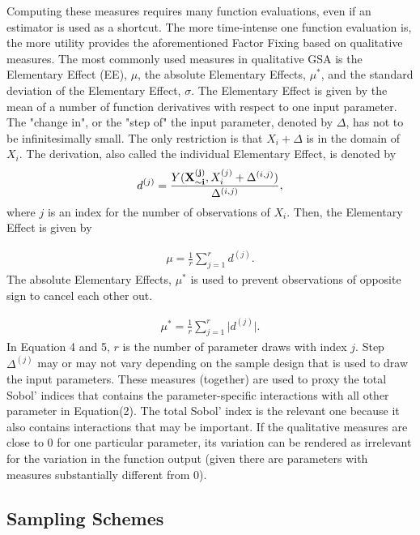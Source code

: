 \documentclass[a4paper,12pt]{article}
\begin{document}
\noindent
Computing these measures requires many function evaluations, even if an estimator is used as a shortcut. The more time-intense one function evaluation is, the more utility provides the aforementioned Factor Fixing based on qualitative measures. The most commonly used measures in qualitative GSA is the Elementary Effect (EE), $\mu$, the absolute Elementary Effects, $\mu^*$, and the standard deviation of the Elementary Effect, $\sigma$. The Elementary Effect is given by the mean of a number of function derivatives with respect to one input parameter. The "change in", or the "step of" the input parameter, denoted by $\Delta$, has not to be infinitesimally small. The only restriction is that $X_i + \Delta$ is in the domain of $X_i$. The derivation, also called the individual Elementary Effect, is denoted by
\begin{align}
d^{(j)} =  \frac{Y(\bold{X_{\sim i}^{(j)}}, X_i^{(j)} + \Delta^{(i,j)})}{\Delta^{(i,j)}},
\end{align}
where $j$ is an index for the number of observations of $X_i$.
Then, the Elementary Effect is given by

\begin{align}
\mu = \frac{1}{r} \sum_{j=1}^{r} d^{(j)}.
\end{align}
\noindent
The absolute Elementary Effects, $\mu^*$ is used to prevent observations of opposite sign to cancel each other out.

\begin{align}
\mu^* = \frac{1}{r} \sum_{j=1}^{r} \big| d^{(j)} \big|.
\end{align}
\noindent
In Equation 4 and 5, $r$ is the number of parameter draws with index $j$. Step $\Delta^{(j)}$ may or may not vary depending on the sample design that is used to draw the input parameters. These measures (together) are used to proxy the total Sobol' indices that contains the parameter-specific interactions with all other parameter in Equation(2). The total Sobol' index is the relevant one because it also contains interactions that may be important. If the qualitative measures are close to 0 for one particular parameter, its variation can be rendered as irrelevant for the variation in the function output (given there are parameters with measures substantially different from 0).

\subsection{Sampling Schemes}
\end{document}
